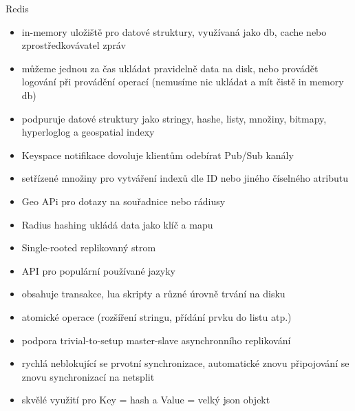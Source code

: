 \documentclass{article}
\begin{document}
	\begin{subsubsection}{Redis}
		\begin{itemize}
			\item in-memory uložiště pro datové struktury, využívaná jako db, cache nebo zprostředkovávatel zpráv
			\item můžeme jednou za čas ukládat pravidelně data na disk, nebo provádět logování při provádění operací (nemusíme nic ukládat a mít čistě in memory db)
			\item podpuruje datové struktury jako stringy, hashe, listy, množiny, bitmapy, hyperloglog a geospatial indexy
			\item Keyspace notifikace dovoluje klientům odebírat Pub/Sub kanály
			\item setřízené množiny pro vytváření indexů dle ID nebo jiného číselného atributu
			\item Geo APi pro dotazy na souřadnice nebo rádiusy
			\item Radius hashing ukládá data jako klíč a mapu
			\item Single-rooted replikovaný strom
			\item API pro populární používané jazyky
			\item obsahuje transakce, lua skripty a různé úrovně trvání na disku
			\item atomické operace (rozšíření stringu, přídání prvku do listu atp.)
			\item podpora trivial-to-setup master-slave asynchronního replikování
			\item rychlá neblokující se prvotní synchronizace, automatické znovu připojování se znovu synchronizací na netsplit
			\item skvělé využití pro Key = hash a Value = velký json objekt
		\end{itemize}
	\end{subsubsection}
\end{document}
